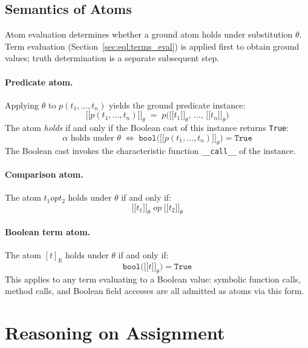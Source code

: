 \documentclass[11pt, a4paper]{article}
\newcommand{\llbracket}{\mathopen{[\![}}
\newcommand{\rrbracket}{\mathclose{]\!]}}
\theoremstyle{plain}
\theoremstyle{definition}
\theoremstyle{remark}
\begin{document}
\subsection{Semantics of Atoms}
\label{sec:eql:atoms_eval}

Atom evaluation determines whether a ground atom holds under substitution $\theta$.  Term
evaluation (Section~\ref{sec:eql:terms_eval}) is applied first to obtain ground values; truth determination is a separate
subsequent step.

\paragraph{Predicate atom.}
Applying $\theta$ to $p(t_1, \ldots, t_n)$ yields the ground predicate instance:
\[
  \llbracket p(t_1, \ldots, t_n) \rrbracket_\theta
  \;=\;
  p\!\bigl(
    \llbracket t_1 \rrbracket_\theta,\,\ldots,\,
    \llbracket t_n \rrbracket_\theta
  \bigr)
\]
The atom \emph{holds} if and only if the Boolean cast of this instance returns \texttt{True}:
\[
  \alpha \text{ holds under } \theta
  \;\iff\;
  \texttt{bool}\!\bigl(\llbracket p(t_1, \ldots, t_n) \rrbracket_\theta\bigr)
  = \texttt{True}
\]
The Boolean cast invokes the characteristic function \texttt{\_\_call\_\_} of the instance.

\paragraph{Comparison atom.}
The atom $t_1 \mathbin{\mathit{op}} t_2$ holds under $\theta$ if and only if:
\[
  \llbracket t_1 \rrbracket_\theta \;\mathit{op}\; \llbracket t_2 \rrbracket_\theta
\]

\paragraph{Boolean term atom.}
The atom $[t]_\mathbb{B}$ holds under $\theta$ if and only if:
\[
  \texttt{bool}\!\bigl(\llbracket t \rrbracket_\theta\bigr) = \texttt{True}
\]
This applies to any term evaluating to a Boolean value: symbolic function calls, method calls,
and Boolean field accesses are all admitted as atoms via this form.

\section{Reasoning on Assignment}
\label{sec:descriptors}
\end{document}
